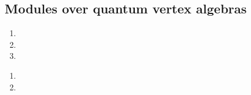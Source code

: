     \subsection{Modules over quantum vertex algebras}
        \begin{definition} \label{def: formal_quantum_vertex_algebra_(quasi)_modules}
            \begin{enumerate}
                \item 
                \item 
                \item 
            \end{enumerate}
        \end{definition}
    
        \begin{definition} \label{def: formal_quantum_vertex_algebra_deformed_(quasi)_modules}
            \begin{enumerate}
                \item 
                \item 
            \end{enumerate}
        \end{definition}
